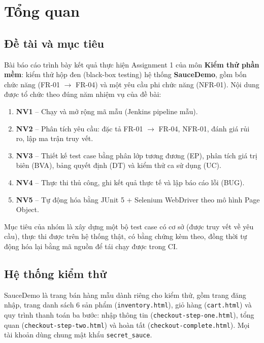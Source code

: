 \documentclass[12pt,a4paper]{article}
\begin{document}
\tableofcontents
\newpage

\section{Tổng quan}

\subsection{Đề tài và mục tiêu}
Bài báo cáo trình bày kết quả thực hiện Assignment 1 của môn \textbf{Kiểm thử phần mềm}: kiểm thử
hộp đen (black-box testing) hệ thống \textbf{SauceDemo}, gồm bốn chức năng
(FR-01 $\rightarrow$ FR-04) và một yêu cầu phi chức năng (NFR-01). Nội dung được tổ chức theo
đúng năm nhiệm vụ của đề bài:

\begin{enumerate}[label=\textbf{NV\arabic*.},leftmargin=2.4em]
    \item \textbf{NV1} -- Chạy và mở rộng mã mẫu (Jenkins pipeline mẫu).
    \item \textbf{NV2} -- Phân tích yêu cầu: đặc tả FR-01 $\rightarrow$ FR-04, NFR-01, đánh giá rủi ro, lập ma trận truy vết.
    \item \textbf{NV3} -- Thiết kế test case bằng phân lớp tương đương (EP), phân tích giá trị biên (BVA), bảng quyết định (DT) và kiểm thử ca sử dụng (UC).
    \item \textbf{NV4} -- Thực thi thủ công, ghi kết quả thực tế và lập báo cáo lỗi (BUG).
    \item \textbf{NV5} -- Tự động hóa bằng JUnit 5 + Selenium WebDriver theo mô hình Page Object.
\end{enumerate}

Mục tiêu của nhóm là xây dựng một bộ test case có cơ sở (được truy vết về yêu cầu), thực thi
được trên hệ thống thật, có bằng chứng kèm theo, đồng thời tự động hóa lại bằng mã nguồn để
tái chạy được trong CI.

\subsection{Hệ thống kiểm thử}
SauceDemo là trang bán hàng mẫu dành riêng cho kiểm thử, gồm trang đăng nhập, trang danh sách
6 sản phẩm (\texttt{inventory.html}), giỏ hàng (\texttt{cart.html}) và quy trình thanh toán ba
bước: nhập thông tin (\texttt{checkout-step-one.html}), tổng quan (\texttt{checkout-step-two.html})
và hoàn tất (\texttt{checkout-complete.html}). Mọi tài khoản dùng chung mật khẩu
\texttt{secret\_sauce}.
\end{document}
